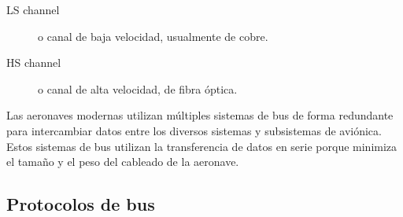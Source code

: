 \begin{description}
\item[LS channel] o canal de baja velocidad, usualmente de cobre.
\item[HS channel] o canal de alta velocidad, de fibra óptica.
\end{description}


\begin{tcolorbox}
  Las aeronaves modernas utilizan múltiples sistemas de bus de forma
  redundante para intercambiar datos entre los diversos sistemas y
  subsistemas de aviónica. Estos sistemas de bus utilizan la
  transferencia de datos en serie porque minimiza el tamaño y el peso
  del cableado de la aeronave.
\end{tcolorbox}

\subsection{Protocolos de bus}
\label{sec:01.05.01.02.protocolos.bus}







